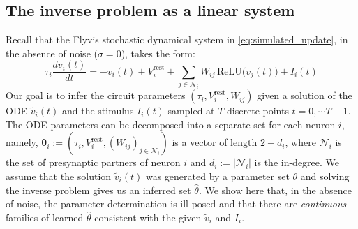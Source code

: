 \documentclass{article}
\def\vrest{V^{\mathrm{rest}}}
\begin{document}
\subsection{{\color{revised}The inverse problem as a linear system}}
\label{app:linsys}

Recall that the Flyvis stochastic dynamical system in \cref{eq:simulated_update}, in the absence of noise ($\sigma=0$), takes the form:
\begin{equation}
    \tau_i\frac{dv_i(t)}{dt} = -v_i(t) + \vrest_i
+ \sum_{j\in\mathcal{N}_i} W_{ij}\,\text{ReLU}\!\big(v_j(t)\big)
+ I_i(t) \label{eq:Flyvis-app-noise-free-ode}
\end{equation}
Our goal is to infer the circuit parameters $(\tau_i, \vrest_i, W_{ij})$ given a solution of the ODE $\tilde{v}_i(t)$ and the stimulus $I_i(t)$ sampled at $T$ discrete points $t=0, \cdots T-1$. The ODE parameters can be decomposed into a separate set for each neuron $i$, namely, {\color{revised}$\boldsymbol{\theta}_i := (\tau_i, \vrest_i, (W_{ij})_{j\in\mathcal{N}_i})$ is a vector of length $2 + d_i$,} where $\mathcal{N}_i$ is the set of presynaptic partners of neuron $i$ and $d_i := |\mathcal{N}_i|$ is the in-degree. We assume that the solution $\tilde{v}_i(t)$ was generated by a parameter set $\theta$ and solving the inverse problem gives us an inferred set $\hat{\theta}$. We show here that, in the absence of noise, the parameter determination is ill-posed and that there are \emph{continuous} families of learned $\hat{\theta}$ consistent with the given $\tilde{v}_i$ and $I_i$.
\end{document}
